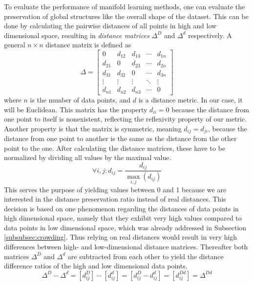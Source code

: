 To evaluate the performance of manifold learning methods, one can evaluate the preservation of global structures like the overall shape of the dataset. This can be done by calculating the pairwise distances of all points in high and low dimensional space, resulting in \textit{distance matrices} $\Delta^D$ and $\Delta^d$ respectively. A general $n \times n$ distance matrix is defined as
\begin{equation}
    \Delta=
    \begin{bmatrix}
        0 & d_{12} & d_{13} & \cdots & d_{1n}\\
        d_{21} & 0 & d_{23} & \cdots & d_{2n}\\
        d_{31} & d_{32} & 0 & \cdots & d_{3n}\\
        \vdots & \vdots & \vdots & \ddots & \vdots\\
        d_{n1} & d_{n2} & d_{n3} & \cdots & 0
    \end{bmatrix}
\end{equation}
where $n$ is the number of data points, and $d$ is a distance metric. In our case, it will be Euclidean. This matrix has the property $d_{ii}=0$ because the distance from one point to itself is nonexistent, reflecting the reflexivity property of our metric. Another property is that the matrix is symmetric, meaning $d_{ij}=d_{ji}$, because the distance from one point to another is the same as the distance from the other point to the one. After calculating the distance matrices, these have to be normalized by dividing all values by the maximal value.
\begin{equation}
    \forall i,j: d_{ij} = \frac{d_{ij}}{\max_{i,j} (d_{ij})}
\end{equation}
This serves the purpose of yielding values between 0 and 1 because we are interested in the distance preservation ratio instead of real distances. This decision is based on one phenomenon regarding the distances of data points in high dimensional space, namely that they exhibit very high values compared to data points in low dimensional space, which was already addressed in Subsection \ref{subsubsec:crowding}. Thus relying on real distances would result in very high differences between high- and low-dimensional distance matrices. Thereafter both matrices $\Delta^D$ and $\Delta^d$ are subtracted from each other to yield the distance difference ratios of the high and low dimensional data points.
\begin{equation}
    \Delta^D - \Delta^d = [d_{ij}^D] - [d_{ij}^d] = [d_{ij}^D - d_{ij}^d] = [d_{ij}^{Dd}] = \Delta^{Dd}
\end{equation}
